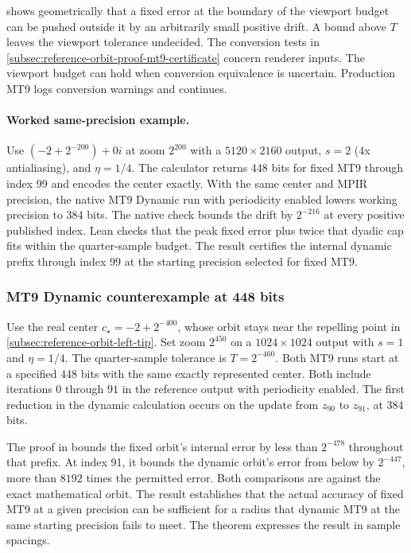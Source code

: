  shows geometrically that a fixed
error at the boundary of the viewport budget can be pushed outside it by
an arbitrarily small positive drift. A bound above \(T\) leaves the
viewport tolerance undecided. The conversion tests in
\cref{subsec:reference-orbit-proof-mt9-certificate} concern renderer
inputs. The viewport budget can hold when conversion equivalence is
uncertain. Production MT9 logs conversion warnings and continues.

\begin{samepage}
\paragraph{Worked same-precision example.}
Use \((-2+2^{-200})+0i\) at zoom \(2^{200}\) with a \(5120\times2160\)
output, \(s=2\) (4x antialiasing), and \(\eta=1/4\). The calculator
returns 448 bits for fixed MT9 through index 99 and encodes the center
exactly. With the same center and MPIR precision, the native MT9 Dynamic
run with periodicity enabled lowers working precision to 384 bits.
The native check bounds the drift by \(2^{-216}\) at every positive
published index.
Lean checks that the peak fixed error plus twice that dyadic cap fits
within the quarter-sample budget. The result certifies the internal dynamic
prefix through index 99 at the starting precision selected for fixed MT9.

\end{samepage}

\subsubsection{MT9 Dynamic counterexample at 448 bits}
\label{subsec:reference-orbit-proof-mt9-counterexample}

Use the real center \(c_\star=-2+2^{-400}\), whose orbit stays near
the repelling point in \cref{subsec:reference-orbit-left-tip}.
Set zoom \(2^{450}\) on a \(1024\times1024\) output with \(s=1\)
and \(\eta=1/4\).
The quarter-sample tolerance is \(T=2^{-460}\).
Both MT9 runs start at a specified 448 bits with the same exactly
represented center. Both include iterations \(0\) through \(91\)
in the reference output with periodicity enabled. The first reduction
in the dynamic calculation occurs on the update from \(z_{90}\)
to \(z_{91}\), at 384 bits.

The proof in  bounds the
fixed orbit's internal error by less than \(2^{-478}\) throughout
that prefix. At index 91, it bounds the dynamic orbit's error from
below by \(2^{-447}\), more than \(8192\) times the permitted error.
Both comparisons are against the exact mathematical orbit. The result
establishes that the actual accuracy of fixed MT9 at a given precision
can be sufficient for a radius that dynamic MT9 at the same starting
precision fails to meet. The theorem
 expresses the result
in sample spacings.

